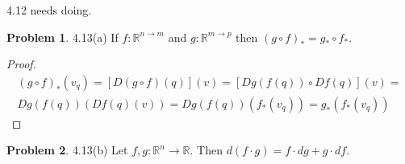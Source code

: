 \documentclass[20pt]{article}
\theoremstyle{plain}
\theoremstyle{definition}
\newtheorem*{problem}{Problem}
\newcommand{\reals}{\mathbb{R}}
\begin{document}
{\color{Blue} 4.12 needs doing.}













































































\begin{problem}{4.13(a)}
  If $f: \reals^{n \to m}$ and $g: \reals^{m \to p}$ then $(g \circ f)_* = g_* \circ f_*$.
\end{problem}

\begin{proof}
  \begin{align*}
      (g \circ f)_*(v_q) =
      [D(g \circ f)(q)](v) =
      [Dg(f(q))\circ Df(q)](v) = \\
      Dg(f(q))(Df(q)(v)) =
      Dg(f(q)) (f_*(v_q)) = g_*(f_*(v_q))
  \end{align*}
\end{proof}


\begin{problem}{4.13(b)}
  Let $f, g : \reals^n \to \reals$. Then $d(f\cdot g) = f \cdot dg  + g \cdot df.$
\end{problem}
\end{document}
